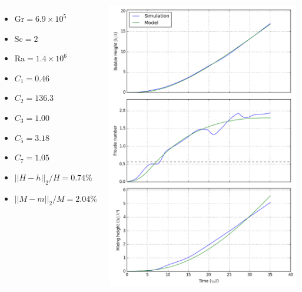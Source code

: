 \documentclass[12pt]{beamer}
\begin{document}
\begin{frame}[plain]
\begin{columns}[c]
\begin{itemize}
  \item $\text{Gr} = 6.9 \times 10^5$
  \item $\text{Sc} = 2$
  \item $\text{Ra} = 1.4 \times 10^6$
  \item $C_1 = 0.46$
  \item $C_2 = 136.3$
  \item $C_3 = 1.00$
  \item $C_5 = 3.18$
  \item $C_7 = 1.05$
  \item $||H-h||_2/H = 0.74\%$
  \item $||M-m||_2/M = 2.04\%$
\end{itemize}
\includegraphics[height=1.05\textheight]{graphics/H-2-1.png}
\end{columns}
\end{frame}
\end{document}
